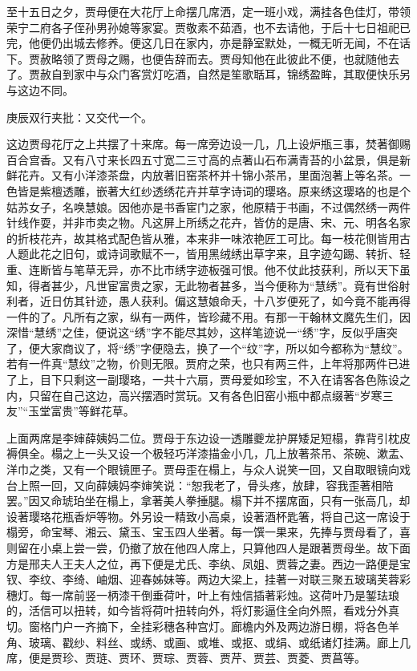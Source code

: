 \begin{parag}


    至十五日之夕，贾母便在大花厅上命摆几席洒，定一班小戏，满挂各色佳灯，带领荣宁二府各子侄孙男孙媳等家宴。贾敬素不茹酒，也不去请他，于后十七日祖祀已完，他便仍出城去修养。便这几日在家内，亦是静室默处，一概无听无闻，不在话下。贾赦略领了贾母之赐，也便告辞而去。贾母知他在此彼此不便，也就随他去了。贾赦自到家中与众门客赏灯吃酒，自然是笙歌聒耳，锦绣盈眸，其取便快乐另与这边不同。\begin{note}庚辰双行夹批：又交代一个。\end{note}
\end{parag}


\begin{parag}


    这边贾母花厅之上共摆了十来席。每一席旁边设一几，几上设炉瓶三事，焚著御赐百合宫香。又有八寸来长四五寸宽二三寸高的点著山石布满青苔的小盆景，俱是新鲜花卉。又有小洋漆茶盘，内放著旧窑茶杯并十锦小茶吊，里面泡著上等名茶。一色皆是紫檀透雕，嵌著大红纱透绣花卉并草字诗词的璎珞。原来绣这璎珞的也是个姑苏女子，名唤慧娘。因他亦是书香宦门之家，他原精于书画，不过偶然绣一两件针线作耍，并非市卖之物。凡这屏上所绣之花卉，皆仿的是唐、宋、元、明各名家的折枝花卉，故其格式配色皆从雅，本来非一味浓艳匠工可比。每一枝花侧皆用古人题此花之旧句，或诗词歌赋不一，皆用黑绒绣出草字来，且字迹勾踢、转折、轻重、连断皆与笔草无异，亦不比市绣字迹板强可恨。他不仗此技获利，所以天下虽知，得者甚少，凡世宦富贵之家，无此物者甚多，当今便称为“慧绣”。竟有世俗射利者，近日仿其针迹，愚人获利。偏这慧娘命夭，十八岁便死了，如今竟不能再得一件的了。凡所有之家，纵有一两件，皆珍藏不用。有那一干翰林文魔先生们，因深惜“慧绣”之佳，便说这“绣”字不能尽其妙，这样笔迹说一“绣”字，反似乎唐突了，便大家商议了，将“绣”字便隐去，换了一个“纹”字，所以如今都称为“慧纹”。若有一件真“慧纹”之物，价则无限。贾府之荣，也只有两三件，上年将那两件已进了上，目下只剩这一副璎珞，一共十六扇，贾母爱如珍宝，不入在请客各色陈设之内，只留在自己这边，高兴摆酒时赏玩。又有各色旧窑小瓶中都点缀著“岁寒三友”“玉堂富贵”等鲜花草。
\end{parag}


\begin{parag}


    上面两席是李婶薛姨妈二位。贾母于东边设一透雕夔龙护屏矮足短榻，靠背引枕皮褥俱全。榻之上一头又设一个极轻巧洋漆描金小几，几上放著茶吊、茶碗、漱盂、洋巾之类，又有一个眼镜匣子。贾母歪在榻上，与众人说笑一回，又自取眼镜向戏台上照一回，又向薛姨妈李婶笑说：“恕我老了，骨头疼，放肆，容我歪著相陪罢。”因又命琥珀坐在榻上，拿著美人拳捶腿。榻下并不摆席面，只有一张高几，却设著璎珞花瓶香炉等物。外另设一精致小高桌，设著酒杯匙箸，将自己这一席设于榻旁，命宝琴、湘云、黛玉、宝玉四人坐著。每一馔一果来，先捧与贾母看了，喜则留在小桌上尝一尝，仍撤了放在他四人席上，只算他四人是跟著贾母坐。故下面方是邢夫人王夫人之位，再下便是尤氏、李纨、凤姐、贾蓉之妻。西边一路便是宝钗、李纹、李绮、岫烟、迎春姊妹等。两边大梁上，挂著一对联三聚五玻璃芙蓉彩穗灯。每一席前竖一柄漆干倒垂荷叶，叶上有烛信插著彩烛。这荷叶乃是錾珐琅的，活信可以扭转，如今皆将荷叶扭转向外，将灯影逼住全向外照，看戏分外真切。窗格门户一齐摘下，全挂彩穗各种宫灯。廊檐内外及两边游日棚，将各色羊角、玻璃、戳纱、料丝、或绣、或画、或堆、或抠、或绢、或纸诸灯挂满。廊上几席，便是贾珍、贾琏、贾环、贾琮、贾蓉、贾芹、贾芸、贾菱、贾菖等。
\end{parag}


